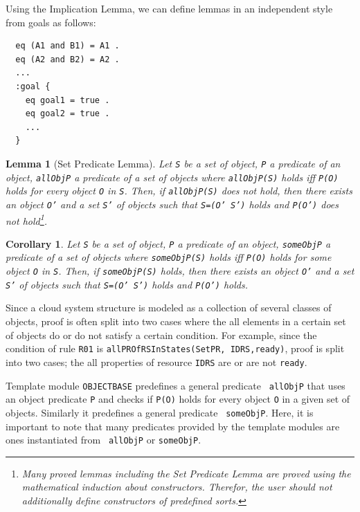 \documentclass[12pt]{report}
\newtheorem{lemma}{Lemma}
\newtheorem{corollary}{Corollary}
\newcommand{\stt}[1]{{\small{\tt {#1}}}}
\begin{document}
Using the Implication Lemma, we can define lemmas in an independent
style from goals as follows:
\small
\begin{verbatim}
  eq (A1 and B1) = A1 .
  eq (A2 and B2) = A2 .
  ...
  :goal {
    eq goal1 = true .
    eq goal2 = true .
    ...
  }
\end{verbatim}
\normalsize

\begin{lemma}[Set Predicate Lemma]
Let {\tt S} be a set of object, {\tt P} a predicate of an object,
{\tt allObjP} a predicate of a set of objects where
\stt{allObjP(S)} holds iff \stt{P(O)} holds for every object {\tt O}
in {\tt S}. Then, if \stt{allObjP(S)} does not hold, then there exists
an object {\tt O'} and a set {\tt S'} of objects such that \stt{S=(O'
  S')} holds and \stt{P(O')} does not hold\footnote{Many proved lemmas
  including the Set Predicate Lemma are proved using the mathematical induction
  about constructors. Therefor, the user should not additionally define
  constructors of predefined sorts.}.
\end{lemma}
\begin{corollary}
Let {\tt S} be a set of object, {\tt P} a predicate of an object,
{\tt someObjP} a predicate of a set of objects where
\stt{someObjP(S)} holds iff \stt{P(O)} holds for some object {\tt O}
in {\tt S}. Then, if \stt{someObjP(S)} holds, then there exists an
object {\tt O'} and a set {\tt S'} of objects such that \stt{S=(O'
  S')} holds and \stt{P(O')} holds.
\end{corollary}
Since a cloud system structure is modeled as a collection of several
classes of objects, proof is often split into two cases where the all
elements in a certain set of objects do or do not satisfy a certain
condition.  For example, since the condition of rule {\tt R01} is 
\stt{allPROfRSInStates(SetPR, IDRS,ready)}, proof is split into two
cases; the all properties of resource {\tt IDRS} are or are not
{\tt ready}.

Template module {\tt OBJECTBASE} predefines a general predicate {\tt
  allObjP} that uses an object predicate {\tt P} and checks if
\stt{P(O)} holds for every object {\tt O} in a given set of
objects. Similarly it predefines a general predicate {\tt
  someObjP}. Here, it is important to note that many predicates
provided by the template modules are ones instantiated from {\tt
  allObjP} or {\tt someObjP}.
\end{document}
